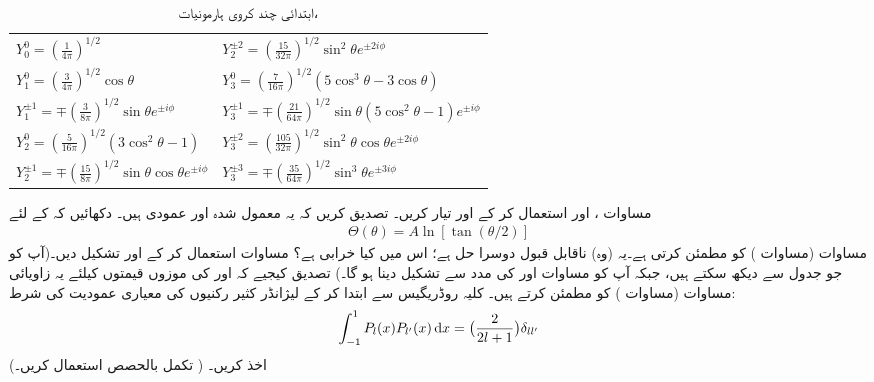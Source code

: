 \begin{table}
\caption{ابتدائی چند کروی ہارمونیات، }
\label{جدول_ابعادی_کروی_ہارمونیات}
\renewcommand{\arraystretch}{2} 
\centering
\begin{tabular}{ll}
$Y_0^0=(\frac{1}{4\pi})^{1/2}$ & $Y_2^{\pm 2}=(\frac{15}{32\pi})^{1/2}\sin^2\theta e^{\pm 2 i \phi}$\\
$Y_1^0=(\frac{3}{4\pi})^{1/2}\cos\theta$ & $Y_3^0=(\frac{7}{16\pi})^{1/2}(5\cos^3\theta-3\cos\theta)$\\
$Y_1^{\pm 1}=\mp(\frac{3}{8\pi})^{1/2}\sin\theta e^{\pm i\phi}$ & $Y_3^{\pm 1}=\mp(\frac{21}{64\pi})^{1/2}\sin\theta(5\cos^2\theta-1)e^{\pm i\phi}$\\
$Y_2^0=(\frac{5}{16\pi})^{1/2}(3\cos^2\theta-1)$ & $Y_3^{\pm 2}=(\frac{105}{32\pi})^{1/2}\sin^2\theta\cos\theta e^{\pm 2 i \phi}$\\
$Y_2^{\pm 1}=\mp(\frac{15}{8\pi})^{1/2}\sin\theta\cos\theta e^{\pm i\phi}$ & $Y_3^{\pm3}=\mp(\frac{35}{64\pi})^{1/2}\sin^3\theta e^{\pm 3 i \phi}$
\end{tabular}
\end{table}
مساوات ،  اور  استعمال کر کے  اور  تیار کریں۔ تصدیق کریں کہ یہ معمول شدہ اور عمودی ہیں۔
%
دکھائیں کہ  کے لئے
\begin{align*}
\Theta(\theta)=A\ln[\tan(\theta/2)] 
\end{align*}
 مساوات  (مساوات ) کو مطمئن کرتی ہے۔یہ (وہ) ناقابل قبول دوسرا حل ہے؛ اس میں کیا خرابی ہے؟
%
مساوات  استعمال کر کے  اور 
 تشکیل دیں۔(آپ  کو جو جدول  سے دیکھ سکتے ہیں، جبکہ  آپ کو مساوات  اور  کی مدد سے  تشکیل دینا ہو گا۔) تصدیق کیجیے کہ   اور  کی موزوں قیمتوں کیلئے یہ زاویائی مساوات (مساوات ) کو  مطمئن کرتے ہیں۔
%
کلیہ روڈریگیس سے ابتدا کر کے  لیژانڈر  کثیر رکنیوں کی معیاری عمودیت کی شرط:
\begin{align}
\int_{-1}^{1}P_{l}(x)P_{l'}(x)\dif x=\big(\frac{2}{2l+1}\big)\delta_{ll'} 
\end{align}
اخذ کریں۔ ( تکمل بالحصص استعمال کریں۔)

